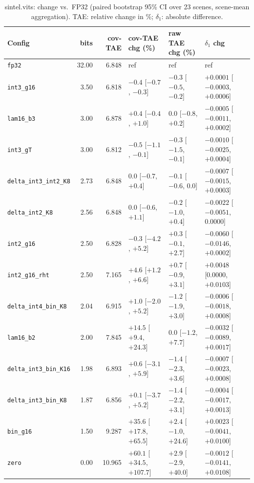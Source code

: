 \begin{table}[t]
\centering
\small
\caption{sintel.vits: change vs.\ FP32 (paired bootstrap 95\% CI over 23 scenes, scene-mean aggregation). TAE: relative change in \%; $\delta_1$: absolute difference.}
\label{tab:boot_sintel_vits_sm}
\begin{tabular}{lrrlll}
\toprule
Config & bits & cov-TAE & cov-TAE chg (\%) & raw TAE chg (\%) & $\delta_1$ chg \\
\midrule
\texttt{fp32} & 32.00 & 6.848 & ref & ref & ref \\
\texttt{int3\_g16} & 3.50 & 6.818 & $-0.4$ [$-0.7$, $-0.3$] & $-0.3$ [$-0.5$, $-0.2$] & $+0.0001$ [$-0.0003$, $+0.0006$] \\
\texttt{lam16\_b3} & 3.00 & 6.878 & $+0.4$ [$-0.4$, $+1.0$] & 0.0 [$-0.8$, $+0.2$] & $-0.0005$ [$-0.0011$, $+0.0002$] \\
\texttt{int3\_gT} & 3.00 & 6.812 & $-0.5$ [$-1.1$, $-0.1$] & $-0.3$ [$-1.5$, $-0.1$] & $-0.0010$ [$-0.0025$, $+0.0004$] \\
\texttt{delta\_int3\_int2\_K8} & 2.73 & 6.848 & 0.0 [$-0.7$, $+0.4$] & $-0.1$ [$-0.6$, 0.0] & $-0.0007$ [$-0.0015$, $+0.0003$] \\
\texttt{delta\_int2\_K8} & 2.56 & 6.848 & 0.0 [$-0.6$, $+1.1$] & $-0.2$ [$-1.0$, $+0.4$] & $-0.0022$ [$-0.0051$, 0.0000] \\
\texttt{int2\_g16} & 2.50 & 6.828 & $-0.3$ [$-4.2$, $+5.2$] & $+0.3$ [$-0.1$, $+2.7$] & $-0.0060$ [$-0.0146$, $+0.0002$] \\
\texttt{int2\_g16\_rht} & 2.50 & 7.165 & $+4.6$ [$+1.2$, $+6.6$] & $+0.7$ [$-0.9$, $+3.1$] & $+0.0048$ [0.0000, $+0.0103$] \\
\texttt{delta\_int4\_bin\_K8} & 2.04 & 6.915 & $+1.0$ [$-2.0$, $+5.2$] & $-1.2$ [$-1.9$, $+3.0$] & $-0.0006$ [$-0.0018$, $+0.0008$] \\
\texttt{lam16\_b2} & 2.00 & 7.845 & $+14.5$ [$+9.4$, $+24.3$] & 0.0 [$-1.2$, $+7.7$] & $-0.0032$ [$-0.0089$, $+0.0017$] \\
\texttt{delta\_int3\_bin\_K16} & 1.98 & 6.893 & $+0.6$ [$-3.1$, $+5.9$] & $-1.4$ [$-2.3$, $+3.6$] & $-0.0007$ [$-0.0023$, $+0.0008$] \\
\texttt{delta\_int3\_bin\_K8} & 1.87 & 6.856 & $+0.1$ [$-3.7$, $+5.2$] & $-1.4$ [$-2.2$, $+3.1$] & $-0.0004$ [$-0.0017$, $+0.0013$] \\
\texttt{bin\_g16} & 1.50 & 9.287 & $+35.6$ [$+17.8$, $+65.5$] & $+2.4$ [$-1.0$, $+24.6$] & $+0.0023$ [$-0.0041$, $+0.0100$] \\
\texttt{zero} & 0.00 & 10.965 & $+60.1$ [$+34.5$, $+107.7$] & $+2.9$ [$-2.9$, $+40.0$] & $-0.0012$ [$-0.0141$, $+0.0108$] \\
\bottomrule
\end{tabular}
\end{table}
